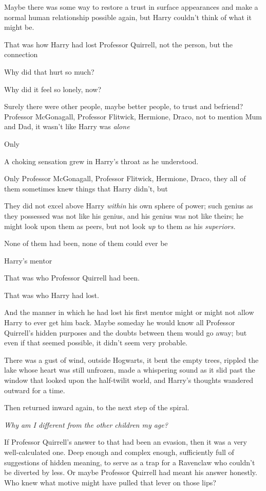 Maybe there was some way to restore a trust in surface appearances and make a
normal human relationship possible again, but Harry couldn't think of what it
might be.

That was how Harry had lost Professor Quirrell, not the person, but the{\el}
connection{\el}

Why did that hurt so much?

Why did it feel so lonely, now?

Surely there were other people, maybe better people, to trust and befriend?
Professor McGonagall, Professor Flitwick, Hermione, Draco, not to mention Mum
and Dad, it wasn't like Harry was \emph{alone{\el}}

Only{\el}

A choking sensation grew in Harry's throat as he understood.

Only Professor McGonagall, Professor Flitwick, Hermione, Draco, they all of
them sometimes knew things that Harry didn't, but{\el}

They did not excel above Harry \emph{within} his own sphere of power; such
genius as they possessed was not like his genius, and his genius was not like
theirs; he might look upon them as peers, but not look \emph{up} to them as his
\emph{superiors.}

None of them had been, none of them could ever be{\el}

Harry's mentor{\el}

That was who Professor Quirrell had been.

That was who Harry had lost.

And the manner in which he had lost his first mentor might or might not allow
Harry to ever get him back. Maybe someday he would know all Professor
Quirrell's hidden purposes and the doubts between them would go away; but even
if that seemed possible, it didn't seem very probable.

There was a gust of wind, outside Hogwarts, it bent the empty trees, rippled
the lake whose heart was still unfrozen, made a whispering sound as it slid
past the window that looked upon the half-twilit world, and Harry's thoughts
wandered outward for a time.

Then returned inward again, to the next step of the spiral.

\emph{Why am I different from the other children my age?}

If Professor Quirrell's answer to that had been an evasion, then it was a very
well-calculated one. Deep enough and complex enough, sufficiently full of
suggestions of hidden meaning, to serve as a trap for a Ravenclaw who couldn't
be diverted by less. Or maybe Professor Quirrell had meant his answer honestly.
Who knew what motive might have pulled that lever on those lips?

